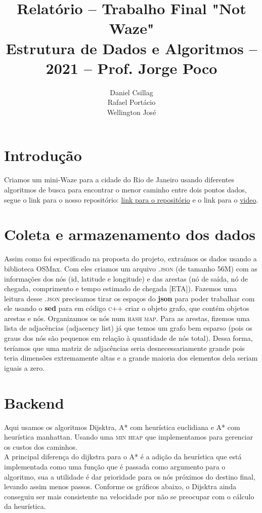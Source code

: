 \documentclass{article}
\title{Relatório -- Trabalho Final "Not Waze"\\
       \large Estrutura de Dados e Algoritmos -- 2021 -- Prof. Jorge Poco}
\author{Daniel Csillag \\ Rafael Portácio \\ Wellington José}
\begin{document}
\maketitle

\section{Introdução}
Criamos um mini-Waze para a cidade do Rio de Janeiro usando diferentes algoritmos de busca para encontrar o menor caminho entre dois pontos dados, segue o link para o nosso repositório: \href{https://github.com/dccsillag/notwaze}{link para o repositório} e o link para o \href{https://drive.google.com/file/d/1q30WdzyVzDPUxwqeOWxns8QPEoYQ6cza/view?usp=sharing}{video}. 

\section{Coleta e armazenamento dos dados}

Assim como foi especificado na proposta do projeto, extraímos os dados usando a biblioteca OSMnx. Com eles criamos um arquivo \textsc{.json} (de tamanho 56M) com as informações dos nós (id, latitude e longitude) e das arestas (nó de saída, nó de chegada, comprimento e tempo estimado de chegada [ETA]). Fazemos uma leitura desse \textsc{.json} precisamos tirar os espaços do \textbf{json} para poder trabalhar com ele usando o \textbf{sed} para em código \textsc{c++} criar o objeto grafo, que contém objetos arestas e nós. Organizamos os nós num \textsc{hash map}. Para as arestas, fizemos uma lista de adjacências (adjacency list) já que temos um grafo bem esparso (pois os graus dos nós são pequenos em relação à quantidade de nós total). Dessa forma, teríamos que uma matriz de adjacências seria desnecessariamente grande pois teria dimensões extremamente altas e a grande maioria dos elementos dela seriam iguais a zero.

\section{Backend}

Aqui usamos os algoritmos Dijsktra, A* com heurística euclidiana e A* com heurística manhattan. Usando uma \textsc{min heap} que implementamos para gerenciar os custos dos caminhos. \\

A principal diferença do dijkstra para o A* é a adição da heurística que está implementada como uma função que é passada como argumento para o algoritmo, sua a utilidade é dar prioridade para os nós próximos do destino final, levando assim menos passos. Conforme os gráficos abaixo, o Dijsktra ainda conseguiu ser mais consistente na velocidade por não se preocupar com o cálculo da heurística.
\end{document}
